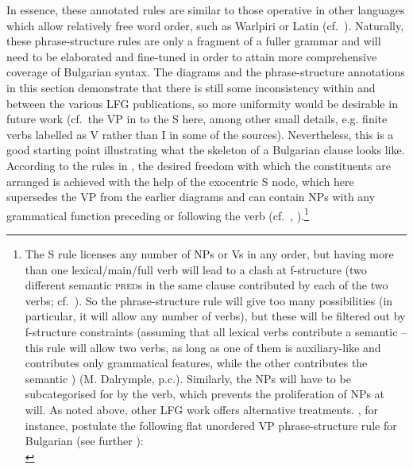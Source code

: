 \documentclass[output=paper,hidelinks]{langscibook}
\begin{document}
         
    In essence, these annotated rules are similar to those operative in other languages which allow relatively free word order, such as Warlpiri or Latin (cf.\ ). Naturally, these phrase-structure rules are only a fragment of a fuller grammar and will need to be elaborated and fine-tuned in order to attain more comprehensive coverage of Bulgarian syntax. The diagrams and the phrase-structure annotations in this section demonstrate that there is still some inconsistency within and between the various LFG publications, so more uniformity would be desirable in future work (cf.\ the VP in  to the S here, among other small details, e.g. finite verbs labelled as V rather than I in some of the sources). Nevertheless, this is a good starting point illustrating what the skeleton of a Bulgarian clause looks like. According to the rules in , the desired freedom with which the constituents are arranged is achieved with the help of the exocentric S node, which here supersedes the VP from the earlier diagrams and can contain NPs with any grammatical function preceding or following the verb (cf.\ \citealt[64--67, 77--78]{dalrymple01}, \citealt[112--114]{DLM:LFG}).\footnote{The S rule licenses any number of NPs or Vs in any order, but having more than one lexical/main/full verb will lead to a clash at f-structure (two different semantic \textsc{pred}s in the same clause contributed by each of the two verbs; cf.\ ). So the phrase-structure rule will give too many possibilities (in particular, it will allow any number of verbs), but these will be filtered out by f-structure constraints (assuming that all lexical verbs contribute a semantic \PRED -- this rule will allow two verbs, as long as one of them is auxiliary-like and contributes only grammatical features, while the other contributes the semantic \PRED) (M. Dalrymple, p.c.). Similarly, the NPs will have to be subcategorised for by the verb, which prevents the proliferation of NPs at will. As noted above, other LFG work offers alternative treatments. \citet[201--202]{JaegerGerassimova2002}, for instance, postulate the following flat unordered VP phrase-structure rule for Bulgarian (see further ):\\
    \ea{}\z}
\end{document}
